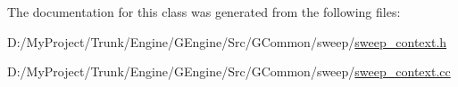 The documentation for this class was generated from the following files\+:\begin{DoxyCompactItemize}
\item 
D\+:/\+My\+Project/\+Trunk/\+Engine/\+G\+Engine/\+Src/\+G\+Common/sweep/\hyperlink{sweep__context_8h}{sweep\+\_\+context.\+h}\item 
D\+:/\+My\+Project/\+Trunk/\+Engine/\+G\+Engine/\+Src/\+G\+Common/sweep/\hyperlink{sweep__context_8cc}{sweep\+\_\+context.\+cc}\end{DoxyCompactItemize}
